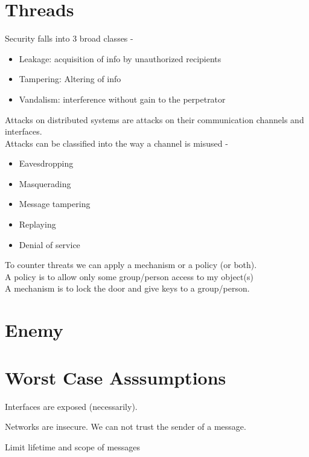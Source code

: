 \section{Threads}

	Security falls into 3 broad classes -
	
	\begin{itemize}
		\item Leakage: acquisition of info by unauthorized recipients 
		\item Tampering: Altering of info
		\item Vandalism: interference without gain to the perpetrator
		
	\end{itemize}
	
	Attacks on distributed systems are attacks on their communication channels and interfaces.  \\
	
	Attacks can be classified into the way a channel is misused -
		
		\begin{itemize}
			\item Eavesdropping
			\item Masquerading
			\item Message tampering
			\item Replaying
			\item Denial of service
		
		\end{itemize}
		
		To counter threats we can apply a mechanism or a policy (or both).\\
		
		A policy is to allow only some group/person access to my object(s)\\
		A mechanism is to lock the door and give keys to a group/person.
	

\section{Enemy}
\section{Worst Case Asssumptions}

Interfaces are exposed (necessarily).

Networks are insecure. We can not trust the sender of a message.

Limit lifetime and scope of messages 